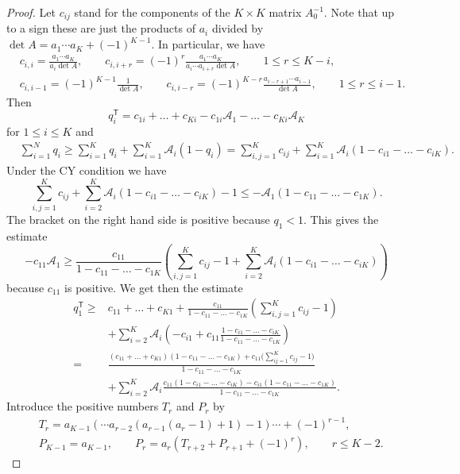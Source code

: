 \documentclass[10pt,a4paper]{article}
\numberwithin{equation}{section}
\def\A{{\mathcal A}}
\begin{document}
\begin{proof}
 Let $c_{ij}$ stand for the components of the $K \times K$ matrix $A_0^{-1}$. Note that up to a sign these are just the products of $a_i$ divided by $\det A = a_1\cdots a_K + (-1)^{K-1}$.
 In particular, we have
 \begin{align*}
 &c_{i,i} = \frac{a_1 \cdots a_K}{a_i \det A}, \qquad c_{i,i+r} = (-1)^r \frac{a_1 \cdots a_K}{a_i \cdots a_{i+r} \det A}, \qquad 1 \le r \le K-i,
 \\
 &c_{i,i-1} = (-1)^{K-1}\frac{1}{\det A}, \qquad c_{i,i-r} = (-1)^{K-r}\frac{a_{i-r+1}\cdots a_{i-1}}{\det A}, \qquad 1 \le r \le i-1.
 \end{align*}
 Then
 \[
 q_i^{\mathsf{T}} = c_{1i} + \dots + c_{Ki} - c_{1i} \A_1 - \dots - c_{Ki} \A_K
 \]
 for $1 \le i \le K$ and
 \begin{align*}
 & \sum_{i=1}^N q_i \ge \sum_{i=1}^K q_i + \sum_{i=1}^K \A_i (1 - q_i)
 = \sum_{i,j=1}^K c_{ij} + \sum_{i=1}^K \A_i (1 - c_{i1} - \dots - c_{iK}).
 \end{align*}
 Under the CY condition we have
 \[
 \sum_{i,j=1}^K c_{ij} + \sum_{i=2}^K \A_i (1 - c_{i1} - \dots - c_{iK}) - 1 \le - \A_1 (1 - c_{11} - \dots - c_{1K}).
 \]
 The bracket on the right hand side is positive because $q_1 < 1$. This gives the estimate
 \[
 - c_{11}\A_1 \ge
 \frac{c_{11}}{1 - c_{11} - \dots - c_{1K}} \left( \sum_{i,j=1}^K c_{ij} -1 + \sum_{i=2}^K \A_i (1 - c_{i1} - \dots - c_{iK}) \right)
 \]
 because $c_{11}$ is positive. We get then the estimate
 \begin{align*}
 q_1^{\mathsf{T}} \ge{}& c_{11} + \dots + c_{K1} + \frac{c_{11}}{1 - c_{11} - \dots - c_{1K}} \left( \sum_{i,j=1}^K c_{ij} - 1 \right)
 \\
 & + \sum_{i=2}^K \A_i \left( - c_{i1} + c_{11} \frac{1 - c_{i1} - \dots - c_{iK}}{1 - c_{11} - \dots - c_{1K}} \right)
 \\
 ={}& \frac{(c_{11}+\dots + c_{K1}) (1 - c_{11} - \dots - c_{1K}) + c_{11} \bigl( \sum_{ij=1}^K c_{ij} -1\bigr)}{1 - c_{11} - \dots - c_{1K}}
 \\
 & + \sum_{i=2}^K \A_i \frac{c_{11}(1 - c_{i1} - \dots - c_{iK}) - c_{i1} (1 - c_{11} - \dots - c_{1K})}{1 - c_{11} - \dots - c_{1K}}.
 \end{align*}
 Introduce the positive numbers $T_r$ and $P_r$ by
 \begin{align*}
 &T_r = a_{K-1}(\cdots a_{r-2}(a_{r-1}(a_r-1) + 1) -1) \cdots + (-1)^{r-1},
 \\
 &P_{K-1} = a_{K-1}, \qquad P_r = a_r (T_{r+2} + P_{r+1} + (-1)^{r}), \qquad r \le K-2.

\end{align*}
\end{proof}
\end{document}
